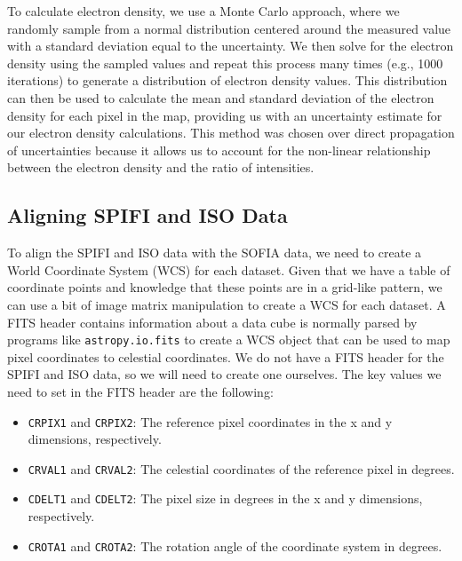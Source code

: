 To calculate electron density, we use a Monte Carlo approach, where we randomly sample from a normal distribution centered around the measured value with a standard deviation equal to the uncertainty.
We then solve for the electron density using the sampled values and repeat this process many times (e.g., 1000 iterations) to generate a distribution of electron density values.
This distribution can then be used to calculate the mean and standard deviation of the electron density for each pixel in the map, providing us with an uncertainty estimate for our electron density calculations.
This method was chosen over direct propagation of uncertainties because it allows us to account for the non-linear relationship between the electron density and the ratio of intensities.

\subsection{Aligning SPIFI and ISO Data}
\label{carina/sec:fits_fit}
To align the SPIFI and ISO data with the SOFIA data, we need to create a World Coordinate System (WCS) for each dataset.
Given that we have a table of coordinate points and knowledge that these points are in a grid-like pattern, we can use a bit of image matrix manipulation to create a WCS for each dataset.
A FITS header contains information about a data cube is normally parsed by programs like \texttt{astropy.io.fits} to create a WCS object that can be used to map pixel coordinates to celestial coordinates.
We do not have a FITS header for the SPIFI and ISO data, so we will need to create one ourselves.
The key values we need to set in the FITS header are the following:
\begin{itemize}
    \item \texttt{CRPIX1} and \texttt{CRPIX2}: The reference pixel coordinates in the x and y dimensions, respectively.
    \item \texttt{CRVAL1} and \texttt{CRVAL2}: The celestial coordinates of the reference pixel in degrees.
    \item \texttt{CDELT1} and \texttt{CDELT2}: The pixel size in degrees in the x and y dimensions, respectively.
    \item \texttt{CROTA1} and \texttt{CROTA2}: The rotation angle of the coordinate system in degrees.
\end{itemize}

